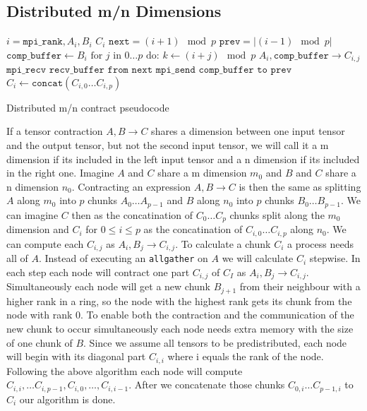\subsection{Distributed m/n Dimensions}

\begin{algorithm}[h]
        \begin{algorithmic}
        \Require $i = \texttt{mpi\_rank}, A_i, B_i$
        \Ensure $C_i$
        \State $\texttt{next} = (i+1) \mod p$
        \State $\texttt{prev} = |(i-1) \mod p|$
        \State $\texttt{comp\_buffer} \gets B_i$
        \State  $\text{for } j \text{ in } 0\dots p \text{ do:}$
        \State \indent $k \gets (i + j) \mod p$
        \State \indent {}
        \State \indent \indent $A_i, \texttt{comp\_buffer} \rightarrow C_{i,j}$
        \State \indent \indent $\texttt{mpi\_recv recv\_buffer from next}$
        \State \indent \indent $\texttt{mpi\_send comp\_buffer to prev}$
        \State $C_i \gets \texttt{concat}(C_{i,0}\dots C_{i,p})$
    \end{algorithmic}
    \caption{Distributed m/n contract pseudocode}
    \label{m_n_pseudocode}
\end{algorithm}

If a tensor contraction $A,B \rightarrow C$ shares a dimension between one input tensor and the output tensor, but not the second input tensor, we will call it a m dimension if its included in the left input tensor and a n dimension if its included in the right one.
Imagine $A$ and $C$ share a m dimension $m_0$ and $B$ and $C$ share a n dimension $n_0$.
Contracting an expression $A,B \rightarrow C$ is then the same as splitting $A$ along $m_0$ into $p$ chunks $A_0\dots A_{p-1}$ and $B$ along $n_0$ into $p$ chunks $B_0\dots B_{p-1}$.
We can imagine $C$ then as the concatination of $C_0\dots C_p$ chunks split along the $m_0$ dimension and $C_i$ for $0 \leq i \leq p$ as the concatination of $C_{i,0} \dots C_{i,p}$ along $n_0$.
We can compute each $C_{i,j}$ as $A_i,B_j \rightarrow C_{i,j}$.
To calculate a chunk $C_i$ a process needs all of $A$.
Instead of executing an \texttt{allgather} on $A$ we will calculate $C_i$ stepwise.
In each step each node will contract one part $C_{i,j}$ of $C_I$ as $A_i,B_j \rightarrow C_{i,j}$.
Simultaneously each node will get a new chunk $B_{j+1}$ from their neighbour with a higher rank in a ring, so the node with the highest rank gets its chunk from the node with rank 0.
To enable both the contraction and the communication of the new chunk to occur simultaneously each node needs extra memory with the size of one chunk of $B$.
Since we assume all tensors to be predistributed, each node will begin with its diagonal part $C_{i,i}$ where i equals the rank of the node.
Following the above algorithm each node will compute $C_{i,i}, \dots C_{i,p-1},C_{i,0},\dots,C_{i,i-1}$.
After we concatenate those chunks $C_{0,i}\dots C_{p-1,i}$ to $C_i$ our algorithm is done.

